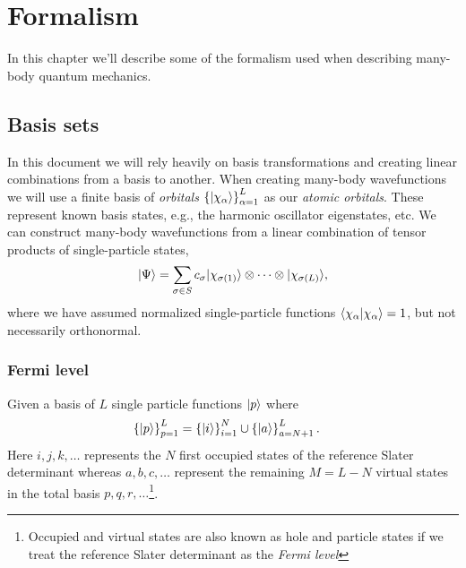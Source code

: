\chapter{Formalism}
    In this chapter we'll describe some of the formalism used when describing
    many-body quantum mechanics.

    \section{Basis sets}
        In this document we will rely heavily on basis transformations and
        creating linear combinations from a basis to another. When creating
        many-body wavefunctions we will use a finite basis of \emph{orbitals}
        $\left\{ | \chi_{\alpha} \rangle \right\}_{\alpha = 1}^{L}$ as our \emph{atomic
        orbitals}. These represent known basis states, e.g., the harmonic
        oscillator eigenstates, etc. We can construct many-body wavefunctions
        from a linear combination of tensor products of single-particle states,
        \begin{align}
            | \Psi \rangle
            = \sum_{\sigma \in S} c_{\sigma}
            | \chi_{\sigma(1)} \rangle\otimes\dots\otimes| \chi_{\sigma(L)} \rangle,
        \end{align}
        where we have assumed normalized single-particle functions
        $\langle \chi_{\alpha} | \chi_{\alpha} \rangle = 1$, but not necessarily
        orthonormal.

        \subsection{Fermi level}
            Given a basis of $L$ single particle functions $| p \rangle$ where
            \begin{align}
                \left\{| p \rangle\right\}_{p = 1}^{L}
                &=
                \left\{| i \rangle\right\}_{i = 1}^{N}
                \cup \left\{| a \rangle\right\}_{a = N + 1}^{L}.
            \end{align}
            Here $i, j, k, \dots$ represents the $N$ first occupied states of
            the reference Slater determinant whereas $a, b, c, \dots$ represent
            the remaining $M = L - N$ virtual states in the total basis $p, q,
            r, \dots$\footnote{Occupied and virtual states are also known as
            hole and particle states if we treat the reference Slater
            determinant as the \textit{Fermi level}}.
